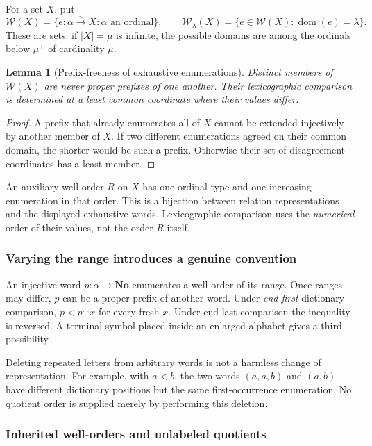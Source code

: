 \documentclass[11pt]{article}
\newtheorem{lemma}[lemma]{Lemma}
\theoremstyle{definition}
\theoremstyle{remark}
\newcommand{\No}{\mathbf{No}}
\newcommand{\W}{\mathcal W}
\newcommand{\dom}{\operatorname{dom}}
\newcommand{\cat}{\mathbin{{}^\frown}}
\begin{document}
For a set $X$, put
\[
 \W(X)=\{e:\alpha\overset{\sim}{\longrightarrow}X:
                   \alpha\text{ an ordinal}\},\qquad
 \W_\lambda(X)=\{e\in\W(X):\dom(e)=\lambda\}.
\]
These are sets: if $|X|=\mu$ is infinite, the possible domains are among
the ordinals below $\mu^+$ of cardinality $\mu$.

\begin{lemma}[Prefix-freeness of exhaustive enumerations]\label{swo:fs:lem:prefixfree}
Distinct members of $\W(X)$ are never proper prefixes of one another.
Their lexicographic comparison is determined at a least common coordinate
where their values differ.
\end{lemma}
\begin{proof}
A prefix that already enumerates all of $X$ cannot be extended injectively
by another member of $X$. If two different enumerations agreed on their
common domain, the shorter would be such a prefix. Otherwise their set
of disagreement coordinates has a least member.
\end{proof}

An auxiliary well-order $R$ on $X$ has one ordinal type and one increasing
enumeration in that order. This is a bijection between relation
representations and the displayed exhaustive words. Lexicographic
comparison uses the \emph{numerical} order of their values, not the order
$R$ itself.

\subsubsection{Varying the range introduces a genuine convention}

An injective word $p:\alpha\to\No$ enumerates a well-order of its range.
Once ranges may differ, $p$ can be a proper prefix of another word. Under
\emph{end-first} dictionary comparison, $p<p\cat x$ for every fresh $x$.
Under end-last comparison the inequality is reversed. A terminal symbol
placed inside an enlarged alphabet gives a third possibility.

Deleting repeated letters from arbitrary words is not a harmless change
of representation. For example, with $a<b$, the two words $(a,a,b)$ and
$(a,b)$ have different dictionary positions but the same first-occurrence
enumeration. No quotient order is supplied merely by performing this
deletion.

\subsubsection{Inherited well-orders and unlabeled quotients}
\end{document}

